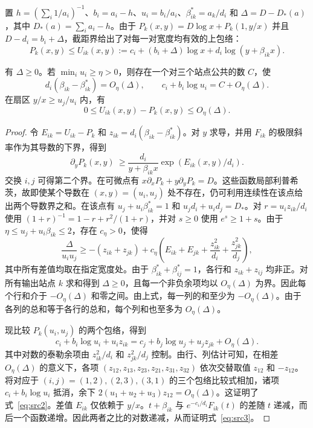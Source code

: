 置 $h=(\sum_i1/a_i)^{-1}$、$b_i=a_i-h$、$u_i=b_i/a_i$、$\beta_{ik}^*=a_k/d_i$ 和 $\Delta=D-D_*(a)$，其中 $D_*(a)=\sum_i a_i-h$。由于 $P_k(x,y)=D\log x+P_k(1,y/x)$ 并且 $D-d_i=b_i+\Delta$，截距界给出了对每一对宽度均有效的上包络：
\begin{equation}\label{eq:profile-upper}
 P_k(x,y)\le U_{ik}(x,y):=c_i+(b_i+\Delta)\log x+d_i\log(y+\beta_{ik}x).
\end{equation}

\begin{proposition}[接触附近的连续价格函数]\label{thm:profile-rigidity}
有 $\Delta\ge0$。若 $\min_i u_i\ge\eta>0$，则存在一个对三个站点公共的数 $C$，使
\begin{equation}\label{eq:src2}
 d_i(\beta_{ik}-\beta_{ik}^*)=O_\eta(\Delta),\qquad
 c_i+b_i\log u_i=C+O_\eta(\Delta).
\end{equation}
在扇区 $y/x\ge u_j/u_i$ 内，有
\begin{equation}\label{eq:src3}
 0\le U_{ik}(x,y)-P_k(x,y)\le O_\eta(\Delta).
\end{equation}
\end{proposition}

\begin{proof}
令 $E_{ik}=U_{ik}-P_k$ 和 $z_{ik}=d_i(\beta_{ik}-\beta^*_{ik})$。对 $y$ 求导，并用 $F_{ik}$ 的极限斜率作为其导数的下界，得到
\[
 \partial_y P_k(x,y)\ \ge \frac{d_i}{y+\beta_{ik}x}\exp(E_{ik}(x,y)/d_i).
\]
交换 $i,j$ 可得第二个界。在可微点有 $x\partial_xP_k+y\partial_yP_k=D$。这些函数局部利普希茨，故即使某个导数在 $(x,y)=(u_i,u_j)$ 处不存在，仍可利用连续性在该点给出两个导数界之和。在该点有 $u_j+u_i\beta^*_{ik}=1$ 和 $u_jd_i+u_id_j=D_*$。对 $r=u_i z_{ik}/d_i$ 使用 $(1+r)^{-1}=1-r+r^2/(1+r)$，并对 $s\ge0$ 使用 $e^s\ge1+s$。由于 $\eta\le u_j+u_i\beta_{ik}\le2$，存在 $c_\eta>0$，使得
\[
 \frac{\Delta}{u_iu_j}\ge -(z_{ik}+z_{jk})+
 c_\eta\left(E_{ik}+E_{jk}
           +\frac{z_{ik}^2}{d_i}+\frac{z_{jk}^2}{d_j}\right),
\]
其中所有差值均取在指定宽度处。由于 $\beta^*_{ik}+\beta^*_{ij}=1$，各行和 $z_{ik}+z_{ij}$ 均非正。对所有输出站点 $k$ 求和得到 $\Delta\ge0$，且每一个非负余项均以 $O_\eta(\Delta)$ 为界。因此每个行和介于 $-O_\eta(\Delta)$ 和零之间。由上式，每一列的和至少为 $-O_\eta(\Delta)$。由于各列的总和等于各行的总和，每个列和也至多为 $O_\eta(\Delta)$。

现比较 $P_k(u_i,u_j)$ 的两个包络，得到
\[
 c_i+b_i\log u_i+u_i z_{ik}
 =c_j+b_j\log u_j+u_j z_{jk}+O_\eta(\Delta).
\]
其中对数的泰勒余项由 $z_{ik}^2/d_i$ 和 $z_{jk}^2/d_j$ 控制。由行、列估计可知，在相差 $O_\eta(\Delta)$ 的意义下，各项 $(z_{12},z_{13},z_{23},z_{21},z_{31},z_{32})$ 依次交替取值 $z_{12}$ 和 $-z_{12}$。将对应于 $(i,j)=(1,2),(2,3),(3,1)$ 的三个包络比较式相加，诸项 $c_i+b_i\log u_i$ 抵消，余下 $2(u_1+u_2+u_3)z_{12}=O_\eta(\Delta)$。这证明了式~\eqref{eq:src2}。差值 $E_{ik}$ 仅依赖于 $y/x$。$t+\beta_{ik}$ 与 $e^{-c_i/d_i}F_{ik}(t)$ 的差随 $t$ 递减，而后一个函数递增。因此两者之比的对数递减，从而证明式~\eqref{eq:src3}。
\end{proof}


